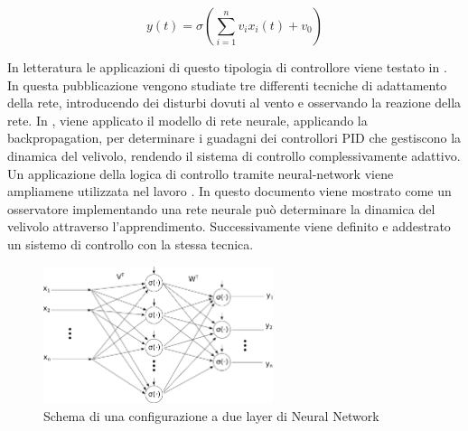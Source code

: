 \begin{equation}\label{eq:SistemaQuadrirotore_NN}
	y(t) = \sigma\left(\sum_{i=1}^{n} v_i x_i(t) + v_0\right)
\end{equation}

In letteratura le applicazioni di questo tipologia di controllore viene testato in \cite{4564736}. In questa pubblicazione vengono studiate tre differenti tecniche di adattamento della rete, introducendo dei disturbi dovuti al vento e osservando la reazione della rete. In \cite{8287305}, viene applicato il modello di rete neurale, applicando la backpropagation, per determinare i guadagni dei controllori PID che gestiscono la dinamica del velivolo, rendendo il sistema di controllo complessivamente adattivo. Un applicazione della logica di controllo tramite neural-network viene ampliamene utilizzata nel lavoro \cite{5345702}. In questo documento viene mostrato come un osservatore implementando una rete neurale può determinare la dinamica del velivolo attraverso l'apprendimento. Successivamente viene definito e addestrato un sistemo di controllo con la stessa tecnica.

\begin{figure}
	\centering
	\includegraphics[width=0.6\textwidth]{SistemaQuadrirotore/Figure/NN_Struttura}
	\caption{Schema di una configurazione a due layer di Neural Network}
	\label{fig:NN}
\end{figure}

